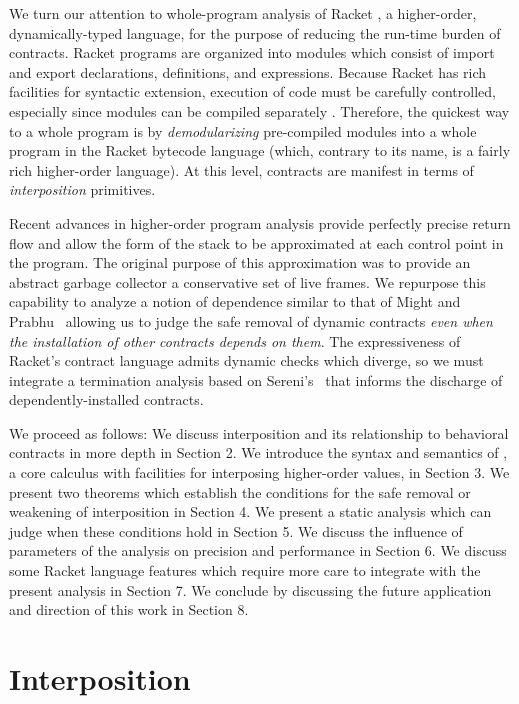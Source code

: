 \documentclass{sigplanconf}
\begin{document}
We turn our attention to whole-program analysis of Racket \cite{plt-tr1}, a higher-order, dynamically-typed language, for the purpose of reducing the run-time burden of contracts.
Racket programs are organized into modules which consist of import and export declarations, definitions, and expressions.
Because Racket has rich facilities for syntactic extension, execution of code must be carefully controlled, especially since modules can be compiled separately \cite{flatt2002composable}.
Therefore, the quickest way to a whole program is by \emph{demodularizing} pre-compiled modules into a whole program in the Racket bytecode language (which, contrary to its name, is a fairly rich higher-order language).
At this level, contracts are manifest in terms of \emph{interposition} primitives.

Recent advances in higher-order program analysis \cite{earl2012introspective} provide perfectly precise return flow and allow the form of the stack to be approximated at each control point in the program.
The original purpose of this approximation was to provide an abstract garbage collector a conservative set of live frames.
We repurpose this capability to analyze a notion of dependence similar to that of Might and Prabhu~\cite{might2009interprocedural} allowing us to judge the safe removal of dynamic contracts \emph{even when the installation of other contracts depends on them}.
The expressiveness of Racket's contract language admits dynamic checks which diverge, so we must integrate a termination analysis based on Sereni's~\cite{sereni2007termination} that informs the discharge of dependently-installed contracts.

We proceed as follows:
We discuss interposition and its relationship to behavioral contracts in more depth in Section 2.
We introduce the syntax and semantics of \chapcalc, a core calculus with facilities for interposing higher-order values, in Section 3.
We present two theorems which establish the conditions for the safe removal or weakening of interposition in Section 4.
We present a static analysis which can judge when these conditions hold in Section 5.
We discuss the influence of parameters of the analysis on precision and performance in Section 6.
We discuss some Racket language features which require more care to integrate with the present analysis in Section 7.
We conclude by discussing the future application and direction of this work in Section 8.


\section{Interposition}
\end{document}
